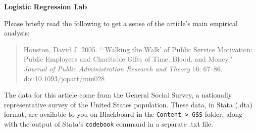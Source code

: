 \documentclass[a4paper,12pt]{article}
\begin{document}
\begin{center}
\textbf{Logistic Regression Lab}
\end{center}

\noindent Please briefly read the following to get a sense of the article's main empirical analysis:

\begin{quote}
Houston, David J. 2005. ```Walking the Walk' of Public Service Motivation: Public Employees and Charitable Gifts of Time, Blood, and Money.'' {\em Journal of Public Administration Research and Theory} 16: 67--86. doi:10.1093/jopart/mui028
\end{quote}

\noindent The data for this article come from the General Social Survey, a nationally representative survey of the United States population. These data, in Stata (.dta) format, are available to you on Blackboard in the \texttt{Content > GSS} folder, along with the output of Stata's \texttt{codebook} command in a separate .txt file.
\end{document}
